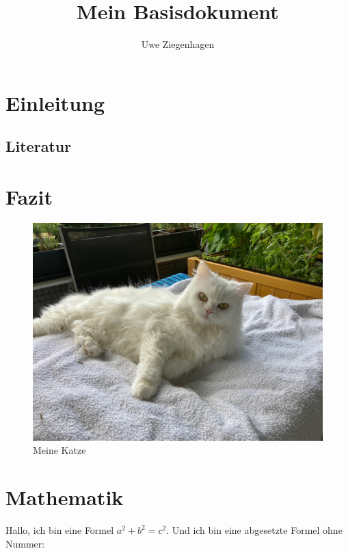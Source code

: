 \documentclass[12pt,ngerman,parskip=half]{scrreprt}
\author{Uwe Ziegenhagen}
\title{Mein Basisdokument}
\begin{document}
\maketitle

\tableofcontents

\listoffigures

\chapter{Einleitung}

\section{Literatur}

\blindtext[2]

\blindtext[2]

\chapter{Fazit}

\begin{figure}[h]
\includegraphics[width=\textwidth]{./Bilder/Katze1.jpg}
\caption{Meine Katze}
\end{figure}

\chapter{Mathematik}

Hallo, ich bin eine Formel \(a^2+b^2=c^2\). Und ich bin eine abgesetzte Formel ohne Nummer:
\end{document}
